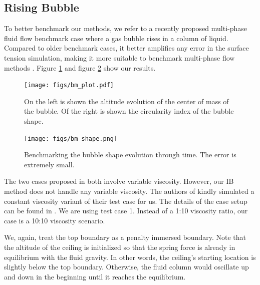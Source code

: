 \documentclass{jfm}
\newcommand{\daniel}[1]{\todo[inline,color=yellow!40]{Daniel: #1}}
\begin{document}
\subsection {Rising Bubble} \label{subsec:rb}
    To better benchmark our methods, we refer to a recently proposed multi-phase fluid flow benchmark case \citep{rising_bubble} where a gas bubble rises in a column of liquid. Compared to older benchmark cases, it better amplifies any error in the surface tension simulation, making it more suitable to benchmark multi-phase flow methods \citep{rising_bubble}. Figure \ref{fig:bm_plot} and figure \ref{fig:bm_shape} show our results. 
    
    \begin{figure}
        \centering
        \texttt{[image: figs/bm\_plot.pdf]}
        \caption{
            On the left is shown the altitude evolution of the center of mass of the bubble. Of the right is shown the circularity index of the bubble shape. 
        }
        \label{fig:bm_plot}
    \end{figure}
    \begin{figure}
        \centering
        \texttt{[image: figs/bm\_shape.png]}
        \caption{
            Benchmarking the bubble shape evolution through time. The error is extremely small. 
        }
        \label{fig:bm_shape}
    \end{figure}

    The two cases proposed in \cite{rising_bubble} both involve variable viscosity. However, our IB method does not handle any variable viscosity. The authors of \cite{rising_bubble} kindly simulated a constant viscosity variant of their test case for us. The details of the case setup can be found in \cite{rising_bubble}. We are using test case 1. Instead of a 1:10 viscosity ratio, our case is a 10:10 viscosity scenario. 
    
    We, again, treat the top boundary as a penalty immersed boundary. Note that the altitude of the ceiling is initialized so that the spring force is already in equilibrium with the fluid gravity. In other words, the ceiling's starting location is slightly below the top boundary. Otherwise, the fluid column would oscillate up and down in the beginning until it reaches the equilibrium. 

\end{document}

